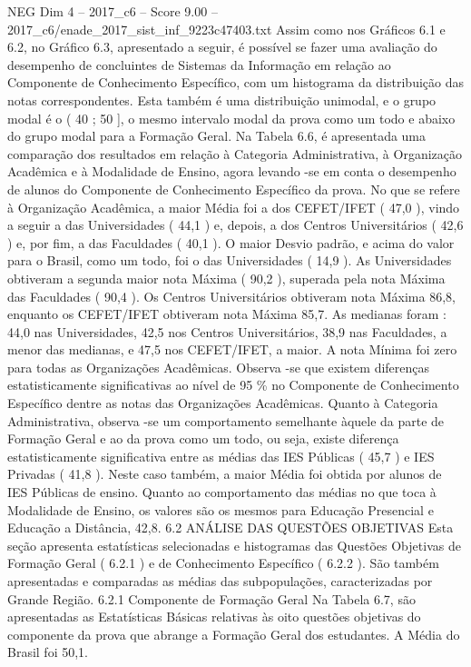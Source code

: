 \begin{textsample}{NEG Dim 4 – 2017\_c6 – Score 9.00 – 2017\_c6/enade\_2017\_sist\_inf\_9223c47403.txt}
Assim como nos Gráficos 6.1 e 6.2, no Gráfico 6.3, apresentado a seguir, é possível se fazer uma avaliação do desempenho de concluintes de Sistemas da Informação em relação ao Componente de Conhecimento Específico, com um histograma da distribuição das notas correspondentes.
Esta também é uma distribuição unimodal, e o grupo modal é o ( 40 ; 50 ], o mesmo intervalo modal da prova como um todo e abaixo do grupo modal para a Formação Geral.
Na Tabela 6.6, é apresentada uma comparação dos resultados em relação à Categoria Administrativa, à Organização Acadêmica e à Modalidade de Ensino, agora levando -se em conta o desempenho de alunos do Componente de Conhecimento Específico da prova.
No que se refere à Organização Acadêmica, a maior Média foi a dos CEFET/IFET ( 47,0 ), vindo a seguir a das Universidades ( 44,1 ) e, depois, a dos Centros Universitários ( 42,6 ) e, por fim, a das Faculdades ( 40,1 ).
O maior Desvio padrão, e acima do valor para o Brasil, como um todo, foi o das Universidades ( 14,9 ).
As Universidades obtiveram a segunda maior nota Máxima ( 90,2 ), superada pela nota Máxima das Faculdades ( 90,4 ).
Os Centros Universitários obtiveram nota Máxima 86,8, enquanto os CEFET/IFET obtiveram nota Máxima 85,7.
As medianas foram : 44,0 nas Universidades, 42,5 nos Centros Universitários, 38,9 nas Faculdades, a menor das medianas, e 47,5 nos CEFET/IFET, a maior.
A nota Mínima foi zero para todas as Organizações Acadêmicas.
Observa -se que existem diferenças estatisticamente significativas ao nível de 95 \% no Componente de Conhecimento Específico dentre as notas das Organizações Acadêmicas.
Quanto à Categoria Administrativa, observa -se um comportamento semelhante àquele da parte de Formação Geral e ao da prova como um todo, ou seja, existe diferença estatisticamente significativa entre as médias das IES Públicas ( 45,7 ) e IES Privadas ( 41,8 ).
Neste caso também, a maior Média foi obtida por alunos de IES Públicas de ensino.
Quanto ao comportamento das médias no que toca à Modalidade de Ensino, os valores são os mesmos para Educação Presencial e Educação a Distância, 42,8. 6.2 ANÁLISE DAS QUESTÕES OBJETIVAS Esta seção apresenta estatísticas selecionadas e histogramas das Questões Objetivas de Formação Geral ( 6.2.1 ) e de Conhecimento Específico ( 6.2.2 ).
São também apresentadas e comparadas as médias das subpopulações, caracterizadas por Grande Região. 6.2.1 Componente de Formação Geral Na Tabela 6.7, são apresentadas as Estatísticas Básicas relativas às oito questões objetivas do componente da prova que abrange a Formação Geral dos estudantes.
A Média do Brasil foi 50,1.

\end{textsample}
